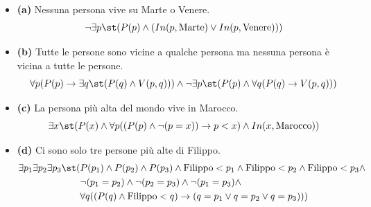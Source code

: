 \begin{itemize}
  \item \textbf{(a)} Nessuna persona vive su Marte o Venere.
    \[ \neg\exists p \st (P(p)\wedge (In(p,\text{Marte})\vee In(p,\text{Venere}))) \]

  \item \textbf{(b)} Tutte le persone sono vicine a qualche persona ma nessuna persona è vicina a tutte le persone.
    \[ \forall p (P(p)\rightarrow \exists q \st (P(q)\wedge V(p,q))) \wedge \neg\exists p \st (P(p)\wedge \forall q (P(q)\rightarrow V(p,q))) \]

  \item \textbf{(c)} La persona più alta del mondo vive in Marocco.
    \[ \exists x \st (P(x)\wedge \forall p ((P(p)\wedge \neg(p=x))\rightarrow p<x) \wedge In(x,\text{Marocco})) \]

  \item \textbf{(d)} Ci sono solo tre persone più alte di Filippo.
    \begin{align*} 
        \exists p_1 \exists p_2 \exists p_3 \st (&P(p_1) \wedge P(p_2) \wedge P(p_3) \wedge \text{Filippo} < p_1 \wedge \text{Filippo} < p_2 \wedge \text{Filippo} < p_3 \wedge \\
        & \neg(p_1=p_2) \wedge \neg(p_2=p_3) \wedge \neg(p_1=p_3) \wedge \\
        & \forall q ((P(q) \wedge \text{Filippo} < q) \rightarrow (q=p_1 \vee q=p_2 \vee q=p_3))) 
    \end{align*}


\end{itemize}
